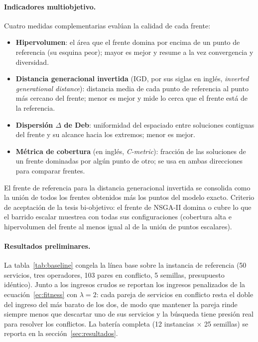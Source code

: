 \documentclass[11pt,a4paper]{article}
\begin{document}
\paragraph{Indicadores multiobjetivo.} Cuatro medidas complementarias
evalúan la calidad de cada frente:

\begin{itemize}
\item \textbf{Hipervolumen}: el área que el frente domina por encima de un
punto de referencia (su esquina peor); mayor es mejor y resume a la vez
convergencia y diversidad.
\item \textbf{Distancia generacional invertida} (IGD, por sus siglas en
inglés, \emph{inverted generational distance}): distancia media de cada
punto de referencia al punto más cercano del frente; menor es mejor y mide
lo cerca que el frente está de la referencia.
\item \textbf{Dispersión $\Delta$ de Deb}: uniformidad del espaciado entre
soluciones contiguas del frente y su alcance hacia los extremos; menor es
mejor.
\item \textbf{Métrica de cobertura} (en inglés, \emph{C-metric}): fracción
de las soluciones de un frente dominadas por algún punto de otro; se usa en
ambas direcciones para comparar frentes.
\end{itemize}

El frente de referencia para la distancia generacional invertida se
consolida como la unión de todos los frentes obtenidos más los puntos del
modelo exacto. Criterio de aceptación de la tesis bi-objetivo: el frente de
NSGA-II domina o cubre lo que el barrido escalar muestrea con todas sus
configuraciones (cobertura alta e hipervolumen del frente al menos igual al
de la unión de puntos escalares).

\paragraph{Resultados preliminares.} La tabla~\ref{tab:baseline} congela la
línea base sobre la instancia de referencia (50 servicios, tres operadores,
103 pares en conflicto, 5 semillas, presupuesto idéntico). Junto a los
ingresos crudos se reportan los ingresos penalizados de la
ecuación~\eqref{ec:fitness} con $\lambda{=}2$: cada pareja de servicios en
conflicto resta el doble del ingreso del más barato de los dos, de modo que
mantener la pareja rinde siempre menos que descartar uno de sus servicios y
la búsqueda tiene presión real para resolver los conflictos. La batería
completa (12 instancias $\times$ 25 semillas) se reporta en
la sección~\ref{sec:resultados}.
\end{document}
